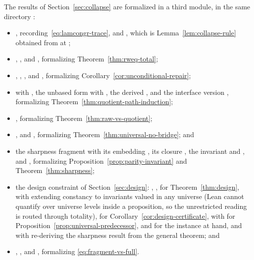 \documentclass[10pt,reqno]{amsart}
\begin{document}
The results of Section~\ref{sec:collapse} are formalized in a third
module, in the same directory
\cite{QuotientPathInductionSoftware2026}:
\begingroup
\footnotesize
\begin{itemize}[leftmargin=1.3em,itemsep=1pt,topsep=3pt]
\item {}, recording~\eqref{eq:lamcongr-trace}, and
  , which is Lemma~\ref{lem:collapse-rule} obtained from
   at ;
\item {}, ,  and
  , formalizing Theorem~\ref{thm:rweq-total};
\item {}, ,
  ,  and
  , formalizing
  Corollary~\ref{cor:unconditional-repair};
\item {} with , the unbased form
   with , the derived
  , and the interface version
  , formalizing
  Theorem~\ref{thm:quotient-path-induction};
\item {}, formalizing
  Theorem~\ref{thm:raw-vs-quotient};
\item {},
   and
  , formalizing
  Theorem~\ref{thm:universal-no-bridge}; and
\item the sharpness fragment  with its embedding
  , its closure , the invariant
   and , and
  , formalizing
  Proposition~\ref{prop:parity-invariant} and Theorem~\ref{thm:sharpness};
\item the design constraint of Section~\ref{sec:design}:
  , ,
   for
  Theorem~\ref{thm:design}, with
   extending
  constancy to invariants valued in any universe (Lean cannot quantify over
  universe levels inside a proposition, so the unrestricted reading is routed
  through totality),  for
  Corollary~\ref{cor:design-certificate},
   with
   for
  Proposition~\ref{prop:universal-predecessor},
   and  for the
  instance at hand, and
   with
   re-deriving the sharpness result
  from the general theorem; and
\item {}, ,
   and
  , formalizing
  \eqref{eq:fragment-vs-full}.
\end{itemize}
\end{document}
